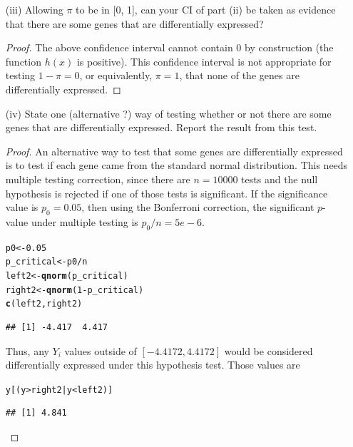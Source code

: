 \documentclass[letterpaper, 12pt]{article}\usepackage[]{graphicx}\usepackage[]{color}
\makeatletter
\newcommand{\hlnum}[1]{\textcolor[rgb]{0.686,0.059,0.569}{#1}}%
\newcommand{\hlopt}[1]{\textcolor[rgb]{0,0,0}{#1}}%
\newcommand{\hlstd}[1]{\textcolor[rgb]{0.345,0.345,0.345}{#1}}%
\newcommand{\hlkwb}[1]{\textcolor[rgb]{0.69,0.353,0.396}{#1}}%
\newcommand{\hlkwd}[1]{\textcolor[rgb]{0.737,0.353,0.396}{\textbf{#1}}}%
\newenvironment{kframe}{%
 \def\at@end@of@kframe{}%
 \ifinner\ifhmode%
  \def\at@end@of@kframe{\end{minipage}}%
  \begin{minipage}{\columnwidth}%
 \fi\fi%
 \def\FrameCommand##1{\hskip\@totalleftmargin \hskip-\fboxsep
 \colorbox{shadecolor}{##1}\hskip-\fboxsep
     \hskip-\linewidth \hskip-\@totalleftmargin \hskip\columnwidth}%
 \MakeFramed {\advance\hsize-\width
   \@totalleftmargin\z@ \linewidth\hsize
   \@setminipage}}%
 {\par\unskip\endMakeFramed%
 \at@end@of@kframe}
\newenvironment{knitrout}{}{} %
\makeatother
\begin{document}
\begin{enumerate}
\begin{enumerate}
\begin{proof}
Hence an approximate 95\% confidence interval for $1-\pi$
is 
\[
\begin{bmatrix}
0.0232 &
0.0789
\end{bmatrix}
\]
\end{proof}
\item[(iii)]
Allowing $\pi$ to be in [0, 1], can your CI of part (ii) be taken as evidence that there are some genes that are differentially expressed?
\begin{proof}
The above confidence interval cannot contain $0$ by construction (the function $h(x)$ is positive). This confidence interval is not appropriate for testing $1 - \pi = 0$, or equivalently, $\pi = 1$, that none of the genes are differentially expressed.
\end{proof}

\item[(iv)]
State one (alternative ?) way of testing whether or not there are some genes that are differentially expressed. Report the result from this test.
\begin{proof}
An alternative way to test that some genes are differentially expressed is to test if each gene came from the standard normal distribution. This needs multiple testing correction, since there are $n = 10000$ tests and the null hypothesis is rejected if one of those tests is significant. If the significance value is $p_0 = 0.05$, then using the Bonferroni correction, the significant $p$-value under multiple testing is $p_0 / n = 5e-6$.
\begin{knitrout}
\color{fgcolor}\begin{kframe}
\begin{alltt}
\hlstd{p0} \hlkwb{<-} \hlnum{0.05}
\hlstd{p_critical} \hlkwb{<-} \hlstd{p0}\hlopt{/}\hlstd{n}
\hlstd{left2} \hlkwb{<-} \hlkwd{qnorm}\hlstd{(p_critical)}
\hlstd{right2} \hlkwb{<-} \hlkwd{qnorm}\hlstd{(}\hlnum{1} \hlopt{-} \hlstd{p_critical)}
\hlkwd{c}\hlstd{(left2, right2)}
\end{alltt}
\begin{verbatim}
## [1] -4.417  4.417
\end{verbatim}
\end{kframe}
\end{knitrout}

Thus, any $Y_i$ values outside of $[-4.4172, 4.4172]$ would be considered differentially expressed under this hypothesis test. Those values are
\begin{knitrout}
\color{fgcolor}\begin{kframe}
\begin{alltt}
\hlstd{y[(y} \hlopt{>} \hlstd{right2} \hlopt{|} \hlstd{y} \hlopt{<} \hlstd{left2)]}
\end{alltt}
\begin{verbatim}
## [1] 4.841
\end{verbatim}
\end{kframe}
\end{knitrout}


\end{proof}
\end{enumerate}
\end{enumerate}
\end{document}
